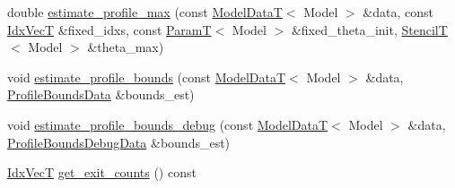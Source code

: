 {\bf }\par
\begin{DoxyCompactItemize}
\item 
double \hyperlink{classmappel_1_1estimator_1_1Estimator_aaadd90fa484e5becd980d2c3e268c97b}{estimate\+\_\+profile\+\_\+max} (const \hyperlink{namespacemappel_a97f050df953605381ae9c901c3b125f1}{Model\+DataT}$<$ Model $>$ \&data, const \hyperlink{namespacemappel_ac63743dcd42180127307cd0e4ecdd784}{Idx\+VecT} \&fixed\+\_\+idxs, const \hyperlink{namespacemappel_a667925cb0d6c0e49f2f035cc5a9a6857}{ParamT}$<$ Model $>$ \&fixed\+\_\+theta\+\_\+init, \hyperlink{namespacemappel_a3a06598240007876f8c4bf834ad86197}{StencilT}$<$ Model $>$ \&theta\+\_\+max)
\end{DoxyCompactItemize}

{\bf }\par
\begin{DoxyCompactItemize}
\item 
void \hyperlink{classmappel_1_1estimator_1_1Estimator_a9efcc3adb2fd64ab75c8954ab29687fc}{estimate\+\_\+profile\+\_\+bounds} (const \hyperlink{namespacemappel_a97f050df953605381ae9c901c3b125f1}{Model\+DataT}$<$ Model $>$ \&data, \hyperlink{structmappel_1_1estimator_1_1ProfileBoundsData}{Profile\+Bounds\+Data} \&bounds\+\_\+est)
\item 
void \hyperlink{classmappel_1_1estimator_1_1Estimator_a67b7910edb97973def5636ed01c3be5f}{estimate\+\_\+profile\+\_\+bounds\+\_\+debug} (const \hyperlink{namespacemappel_a97f050df953605381ae9c901c3b125f1}{Model\+DataT}$<$ Model $>$ \&data, \hyperlink{namespacemappel_1_1estimator_structmappel_1_1estimator_1_1ProfileBoundsDebugData}{Profile\+Bounds\+Debug\+Data} \&bounds\+\_\+est)
\end{DoxyCompactItemize}

{\bf }\par
\begin{DoxyCompactItemize}
\item 
\hyperlink{namespacemappel_ac63743dcd42180127307cd0e4ecdd784}{Idx\+VecT} \hyperlink{classmappel_1_1estimator_1_1Estimator_adde56d397f57f6f4f2d4f10fc59f7a08}{get\+\_\+exit\+\_\+counts} () const 
\end{DoxyCompactItemize}

